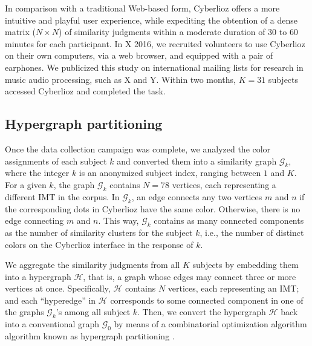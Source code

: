 \documentclass{bmcart}
\makeatletter
\newcommand*{\ie}{i.e.,\@\xspace}
\newcommand{\ipt}{IPT\xspace}
\makeatother
\begin{document}
In comparison with a traditional Web-based form, Cyberlioz offers a more intuitive and playful user experience, while expediting the obtention of a dense matrix ($N\times N$) of similarity judgments within a moderate duration of $30$ to $60$ minutes for each participant.
In X 2016, we recruited volunteers to use Cyberlioz on their own computers, via a web browser, and equipped with a pair of earphones. %
We publicized this study on international mailing lists for research in music audio processing, such as X and Y. %
Within two months, $K=31$ subjects accessed Cyberlioz and completed the task. %

\subsection*{Hypergraph partitioning}
Once the data collection campaign was complete, we analyzed the color assignments of each subject $k$ and converted them into a similarity graph $\mathcal{G}_k$, where the integer $k$ is an anonymized subject index, ranging between $1$ and $K$.
For a given $k$, the graph $\mathcal{G}_k$ contains $N=78$ vertices, each representing a different IMT in the corpus.
In $\mathcal{G}_k$, an edge connects any two vertices $m$ and $n$ if the corresponding dots in Cyberlioz have the same color.
Otherwise, there is no edge connecting $m$ and $n$.
This way, $\mathcal{G}_k$ contains as many connected components as the number of similarity clusters for the subject $k$, \ie{} the number of distinct colors on the Cyberlioz interface in the response of $k$.


We aggregate the similarity judgments from all $K$ subjects by embedding them into a hypergraph $\mathcal{H}$, that is, a graph whose edges may connect three or more vertices at once.
Specifically, $\mathcal{H}$ contains $N$ vertices, each representing an IMT; and each ``hyperedge'' in $\mathcal{H}$ corresponds to some connected component in one of the graphs $\mathcal{G}_k$'s among all subject $k$.
Then, we convert the hypergraph $\mathcal{H}$ back into a conventional graph $\mathcal{G}_0$ by means of a combinatorial optimization algorithm algorithm known as hypergraph partitioning \cite{kernighan1970efficient,han1997scalable,strehl2002cluster}.
\end{document}
